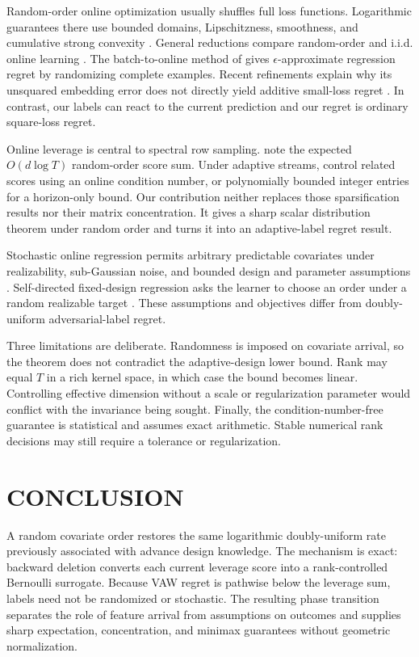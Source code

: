 \documentclass[twoside]{article}
\begin{document}
Random-order online optimization usually shuffles full loss functions. Logarithmic guarantees there use bounded domains, Lipschitzness, smoothness, and cumulative strong convexity \citep{garber2020online,sherman2021optimal}. General reductions compare random-order and i.i.d. online learning \citep{bernasconi2025online}. The batch-to-online method of \citet{dong2023batch} gives $\epsilon$-approximate regression regret by randomizing complete examples. Recent refinements explain why its unsquared embedding error does not directly yield additive small-loss regret \citep{sakaue2026sensitivity}. In contrast, our labels can react to the current prediction and our regret is ordinary square-loss regret.

Online leverage is central to spectral row sampling. \citet{cohen2020online} note the expected $O(d\log T)$ random-order score sum. Under adaptive streams, \citet{goranci2026sparsification} control related scores using an online condition number, or polynomially bounded integer entries for a horizon-only bound. Our contribution neither replaces those sparsification results nor their matrix concentration. It gives a sharp scalar distribution theorem under random order and turns it into an adaptive-label regret result.

Stochastic online regression permits arbitrary predictable covariates under realizability, sub-Gaussian noise, and bounded design and parameter assumptions \citep{ouhamma2021stochastic}. Self-directed fixed-design regression asks the learner to choose an order under a random realizable target \citep{kontonis2023gain}. These assumptions and objectives differ from doubly-uniform adversarial-label regret.

Three limitations are deliberate. Randomness is imposed on covariate arrival, so the theorem does not contradict the adaptive-design lower bound. Rank may equal $T$ in a rich kernel space, in which case the bound becomes linear. Controlling effective dimension without a scale or regularization parameter would conflict with the invariance being sought. Finally, the condition-number-free guarantee is statistical and assumes exact arithmetic. Stable numerical rank decisions may still require a tolerance or regularization.

\section{CONCLUSION}

A random covariate order restores the same logarithmic doubly-uniform rate previously associated with advance design knowledge. The mechanism is exact: backward deletion converts each current leverage score into a rank-controlled Bernoulli surrogate. Because VAW regret is pathwise below the leverage sum, labels need not be randomized or stochastic. The resulting phase transition separates the role of feature arrival from assumptions on outcomes and supplies sharp expectation, concentration, and minimax guarantees without geometric normalization.

\begingroup
\small
\setlength{\bibsep}{1pt}

\endgroup

\clearpage

\clearpage
\appendix

\end{document}
